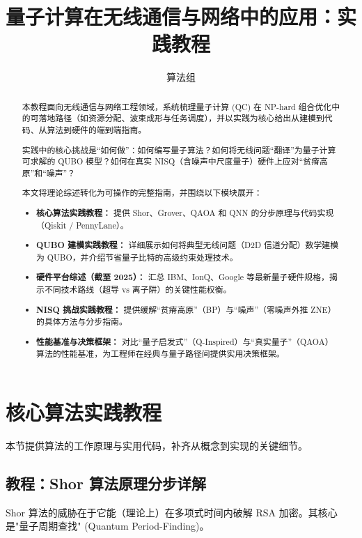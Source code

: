 \documentclass[11pt,a4paper]{article}
\title{\textbf{量子计算在无线通信与网络中的应用：实践教程}}
\author{算法组}
\date{}
\begin{document}
\maketitle

\begin{abstract}
本教程面向无线通信与网络工程领域，系统梳理量子计算 (QC) 在 NP-hard 组合优化中的可落地路径（如资源分配、波束成形与任务调度），并以实践为核心给出从建模到代码、从算法到硬件的端到端指南。

实践中的核心挑战是“如何做”：如何编写量子算法？如何将无线问题“翻译”为量子计算可求解的 QUBO 模型？如何在真实 NISQ（含噪声中尺度量子）硬件上应对“贫瘠高原”和“噪声”？

本文将理论综述转化为可操作的完整指南，并围绕以下模块展开：

\begin{itemize}[leftmargin=0cm]
\item \textbf{核心算法实践教程：} 提供 Shor、Grover、QAOA 和 QNN 的分步原理与代码实现（Qiskit / PennyLane）。
\item \textbf{QUBO 建模实践教程：} 详细展示如何将典型无线问题（D2D 信道分配）数学建模为 QUBO，并介绍节省量子比特的高级约束处理技术。
\item \textbf{硬件平台综述（截至 2025）：} 汇总 IBM、IonQ、Google 等最新量子硬件规格，揭示不同技术路线（超导 vs 离子阱）的关键性能权衡。
\item \textbf{NISQ 挑战实践教程：} 提供缓解“贫瘠高原”（BP）与“噪声”（零噪声外推 ZNE）的具体方法与分步指南。
\item \textbf{性能基准与决策框架：} 对比“量子启发式”（Q-Inspired）与“真实量子”（QAOA）算法的性能基准，为工程师在经典与量子路径间提供实用决策框架。
\end{itemize}
\end{abstract}

 
\newpage

\section{核心算法实践教程}

本节提供算法的工作原理与实用代码，补齐从概念到实现的关键细节。

\subsection{教程：Shor 算法原理分步详解}

Shor 算法的威胁在于它能（理论上）在多项式时间内破解 RSA 加密。其核心是"量子周期查找" (Quantum Period-Finding)。
\end{document}

